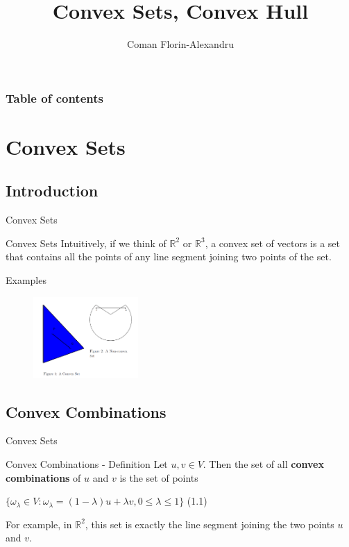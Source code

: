 \documentclass{beamer}
\begin{document}
\title{Convex Sets, Convex Hull}  
\author{Coman Florin-Alexandru}

\begin{frame}
\titlepage
\end{frame}

\begin{frame}\frametitle{Table of contents}\tableofcontents
\end{frame}

\section{Convex Sets}
\subsection{Introduction}
\begin{frame}{Convex Sets}
\begin{block}{Convex Sets}
Intuitively, if we think of $\mathbb{R}^2$ or $\mathbb{R}^3$, a convex set of vectors is a set that contains all the points of any line segment joining two points of the set.
\end{block}
\begin{exampleblock}{Examples}
\begin{figure}[h]
\includegraphics[width=4cm]{picture1}
\end{figure}
\end{exampleblock}
\end{frame}

\subsection{Convex Combinations}
\begin{frame}{Convex Sets}
\begin{block}{Convex Combinations - Definition}
Let $u, v \in V$. Then the set of all \textbf{convex combinations} of $u$ and $v$ is the set of points
\centerline{$\lbrace \omega_\lambda \in V : \omega_\lambda = (1 - \lambda) u + \lambda v, 0 \leq \lambda \leq 1 \rbrace$ \hspace{0.5cm} (1.1)}
\end{block}
\begin{exampleblock}{}
For example, in $\mathbb{R}^2$, this set is exactly the line segment joining the two points $u$ and $v$.
\end{exampleblock}
\end{frame}
\end{document}
